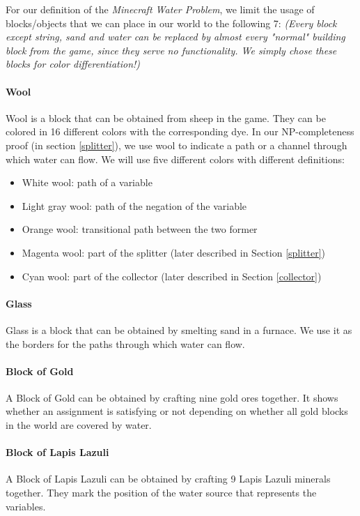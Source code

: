 \noindent For our definition of the \textit{Minecraft Water Problem}, we limit the usage of blocks/objects that we can place in our world to the following 7:
\newline \textit{(Every block except string, sand and water can be replaced by almost every "normal" building block from the game, since they serve no functionality. We simply chose these blocks for color differentiation!)}
\paragraph{Wool\cite{minecraftfandom:wool}}
Wool is a block that can be obtained from sheep in the game.
They can be colored in 16 different colors with the corresponding dye.
In our NP-completeness proof (in section \ref{splitter}), we use wool to indicate a path or a channel through which water can flow.
We will use five different colors with different definitions:
\begin{itemize}
    \item White wool: path of a variable
    \item Light gray wool: path of the negation of the variable
    \item Orange wool: transitional path between the two former
    \item Magenta wool: part of the splitter (later described in Section \ref{splitter})
    \item Cyan wool: part of the collector (later described in Section \ref{collector})
\end{itemize}

\paragraph{Glass\cite{minecraftfandom:glass}}
Glass is a block that can be obtained by smelting sand in a furnace.
We use it as the borders for the paths through which water can flow.

\paragraph{Block of Gold\cite{minecraftfandom:bog}}
A Block of Gold can be obtained by crafting nine gold ores together.
\newline It shows whether an assignment is satisfying or not depending on whether all gold blocks in the world are covered by water.

\paragraph{Block of Lapis Lazuli\cite{minecraftfandom:boll}}
A Block of Lapis Lazuli can be obtained by crafting 9 Lapis Lazuli minerals together.
They mark the position of the water source that represents the variables.

